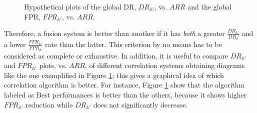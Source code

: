 \begin{figure}[p]
  \centering
  
  

  \caption{Hypothetical plots of  the global
    DR, $DR_{\mathbb{A}'}$, vs. $ARR$ and 
    the global FPR, $FPR_{\mathbb{A}'}$, vs. $ARR$.}
  \label{fig:dummy}
\end{figure}

Therefore, a fusion system is better than another if it has
\emph{both} a greater $\frac{DR_{\mathbb{A}'}}{DR_{\mathbb{A}}}$ and a
lower $\frac{FPR_{\mathbb{A}'}}{FPR_{\mathbb{A}}}$ rate than the
latter. This criterion by no means has to be considered as complete or
exhaustive. In addition, it is useful to compare $DR_{\mathbb{A}'}$
and $FPR_{\mathbb{A}'}$ plots, vs. $ARR$, of different correlation
systems obtaining diagrams like the one exemplified in Figure
\ref{fig:dummy}; this gives a graphical idea of which correlation
algorithm is better. For instance, Figure \ref{fig:dummy} show that
the algorithm labeled as \textsf{Best performances} is better than the
others, because it shows higher $FPR_{\mathbb{A}'}$ reduction while
$DR_{\mathbb{A}'}$ does not significantly decrease.

